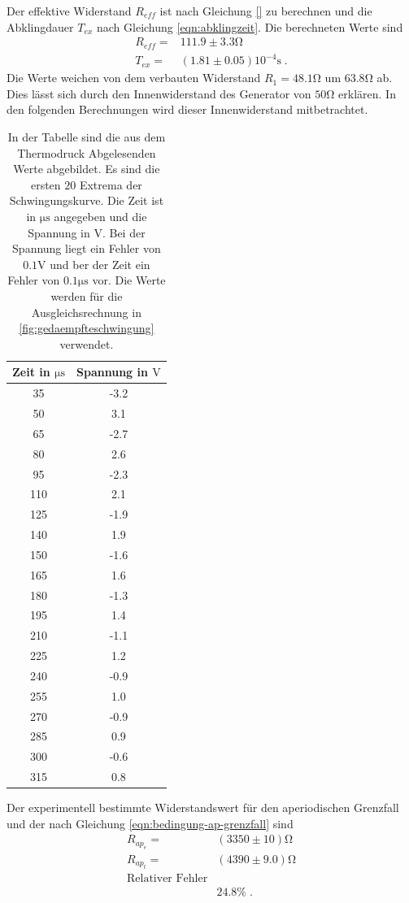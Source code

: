 Der effektive Widerstand $R_{eff}$ ist nach Gleichung \eqref{} zu berechnen und
die Abklingdauer $T_{ex}$ nach Gleichung \eqref{eqn:abklingzeit}. Die berechneten
Werte sind
\begin{align*}
    R_{eff}=&111.9\pm3.3\si{\ohm}\\
    T_{ex}=&(1.81\pm0.05)10^{-4}\si{\second}\;.
\end{align*}
Die Werte weichen von dem verbauten Widerstand $R_1=48.1\si{\ohm}$ um $63.8\si{\ohm}$
ab. Dies lässt sich durch den Innenwiderstand des Generator von $50\si{\ohm}$ erklären.
In den folgenden Berechnungen wird dieser Innenwiderstand mitbetrachtet.
\begin{table}
  \centering
  \begin{tabular}{c c}
    \toprule
    Zeit in $\si{\micro\second}$ & Spannung in $\si{\volt}$  \\
    \midrule
     35  &  -3.2  \\
     50  &   3.1  \\
     65  &  -2.7  \\
     80  &   2.6  \\
     95  &  -2.3  \\
    110  &   2.1  \\
    125  &  -1.9  \\
    140  &   1.9  \\
    150  &  -1.6  \\
    165  &   1.6  \\
    180  &  -1.3  \\
    195  &   1.4  \\
    210  &  -1.1  \\
    225  &   1.2  \\
    240  &  -0.9  \\
    255  &   1.0  \\
    270  &  -0.9  \\
    285  &   0.9  \\
    300  &  -0.6  \\
    315  &   0.8  \\
    \bottomrule
  \end{tabular}
  \caption{In der Tabelle sind die aus dem Thermodruck Abgelesenden Werte abgebildet.
           Es sind die ersten $20$ Extrema der Schwingungskurve. Die Zeit ist
            in  $\si{\micro\second}$ angegeben und die Spannung in $\si{\volt}$.
            Bei der Spannung liegt ein Fehler von $0.1\si{\volt}$ und ber der Zeit
            ein Fehler von $0.1\si{\micro\second}$ vor. Die Werte werden für die
            Ausgleichsrechnung in \ref{fig:gedaempfteschwingung} verwendet.}
  \label{fig:Messwertegedaempfteschwingung}
\end{table}
Der experimentell bestimmte Widerstandswert für den aperiodischen Grenzfall
und  der nach Gleichung \eqref{eqn:bedingung-ap-grenzfall} sind
\begin{align*}
  R_{ap_e}=&(3350\pm10)\si{\ohm}\\
  R_{ap_t}=&(4390\pm9.0)\si{\ohm}\\
  \text{Relativer Fehler}\\
   &24.8\%\;.
\end{align*}


